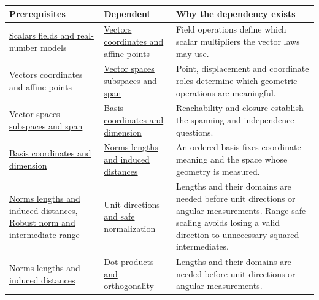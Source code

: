 {\def\LTcaptype{none} %
\begin{longtable}[]{@{}
  >{\raggedright\arraybackslash}p{}
  >{\raggedright\arraybackslash}p{}
  >{\raggedright\arraybackslash}p{}@{}}
\toprule\noalign{}
\begin{minipage}[b]{\linewidth}\raggedright
Prerequisites
\end{minipage} & \begin{minipage}[b]{\linewidth}\raggedright
Dependent
\end{minipage} & \begin{minipage}[b]{\linewidth}\raggedright
Why the dependency exists
\end{minipage} \\
\midrule\noalign{}
\endhead
\bottomrule\noalign{}
\endlastfoot
\hyperref[appendix-52051ad550fe]{Scalars fields and real-number models} & \hyperref[appendix-0659864c0aa3]{Vectors coordinates and affine points} & Field operations define which scalar multipliers the vector laws may use. \\
\hyperref[appendix-0659864c0aa3]{Vectors coordinates and affine points} & \hyperref[appendix-173b52c063ae]{Vector spaces subspaces and span} & Point, displacement and coordinate roles determine which geometric operations are meaningful. \\
\hyperref[appendix-173b52c063ae]{Vector spaces subspaces and span} & \hyperref[appendix-ce0341f7ea0d]{Basis coordinates and dimension} & Reachability and closure establish the spanning and independence questions. \\
\hyperref[appendix-ce0341f7ea0d]{Basis coordinates and dimension} & \hyperref[appendix-49933872bb51]{Norms lengths and induced distances} & An ordered basis fixes coordinate meaning and the space whose geometry is measured. \\
\hyperref[appendix-49933872bb51]{Norms lengths and induced distances}, \hyperref[appendix-7f1e17dcafb1]{Robust norm and intermediate range} & \hyperref[appendix-f744e41b95b4]{Unit directions and safe normalization} & Lengths and their domains are needed before unit directions or angular measurements. Range-safe scaling avoids losing a valid direction to unnecessary squared intermediates. \\
\hyperref[appendix-49933872bb51]{Norms lengths and induced distances} & \hyperref[appendix-8bc4e8fc547c]{Dot products and orthogonality} & Lengths and their domains are needed before unit directions or angular measurements. \\

\end{longtable}}
